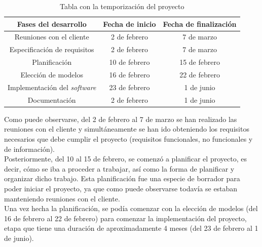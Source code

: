 \begin{table}[H]
        \centering
        \begin{tabular}{c c c } \hline
            \toprule
            \rowcolor{blue!50} 
            \textbf{Fases del desarrollo}   & \textbf{Fecha de inicio} & \textbf{Fecha de finalización} \\
            \midrule
            \rowcolor{blue!25} 
            Reuniones con el cliente        & 2 de febrero      & 7 de marzo    \\ 
            \rowcolor{blue!10} 
            Especificación de requisitos    & 2 de febrero      & 7 de marzo    \\ 
            \rowcolor{blue!25} 
            Planificación                   & 10 de febrero     & 15 de febrero \\ 
            \rowcolor{blue!10} 
            Elección de modelos             & 16 de febrero     & 22 de febrero \\ 
            \rowcolor{blue!25} 
            Implementación del \textit{software}     & 23 de febrero     & 1 de junio    \\ 
            \rowcolor{blue!10} 
            Documentación                   & 2 de febrero      & 1 de junio    \\ \bottomrule
        \end{tabular}
        \label{tab:planning}
        \caption{Tabla con la temporización del proyecto}
\end{table}

Como puede observarse, del 2 de febrero al 7 de marzo se han realizado las reuniones con
el cliente y simultáneamente se han ido obteniendo los requisitos necesarios que debe cumplir
el proyecto (requisitos funcionales, no funcionales y de información).\\

Posteriormente, del 10 al 15 de febrero, se comenzó a planificar el proyecto, es
decir, cómo se iba a proceder a trabajar, así como la forma de planificar y organizar dicho
trabajo. Esta planificación fue una especie de borrador para poder iniciar el proyecto, ya
que como puede observarse todavía se estaban manteniendo reuniones con el cliente.\\

Una vez hecha la planificación, se podía comenzar con la elección de modelos (del 16 de
febrero al 22 de febrero) para comenzar la implementación del proyecto, etapa que
tiene una duración de aproximadamente 4 meses (del 23 de febrero al 1 de junio).\\

